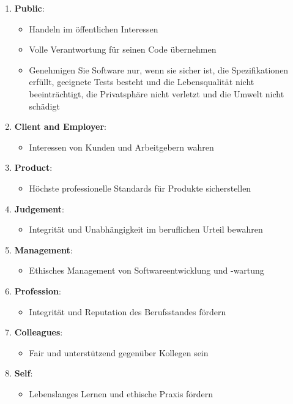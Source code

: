 \documentclass[11pt, a4paper]{article}
\begin{document}
\begin{enumerate}
    \item \textbf{Public}:
    \begin{itemize}
        \item Handeln im öffentlichen Interessen
        \item Volle Verantwortung für seinen Code übernehmen
        \item Genehmigen Sie Software nur, wenn sie sicher ist, die Spezifikationen erfüllt, 
        geeignete Tests besteht und die Lebensqualität nicht beeinträchtigt, 
        die Privatsphäre nicht verletzt und die Umwelt nicht schädigt
    \end{itemize}

    \item \textbf{Client and Employer}:
    \begin{itemize}
        \item Interessen von Kunden und Arbeitgebern wahren
    \end{itemize}

    \item \textbf{Product}:
    \begin{itemize}
        \item Höchste professionelle Standards für Produkte sicherstellen
    \end{itemize}

    \item \textbf{Judgement}:
    \begin{itemize}
        \item Integrität und Unabhängigkeit im beruflichen Urteil bewahren
    \end{itemize}

    \item \textbf{Management}:
    \begin{itemize}
        \item Ethisches Management von Softwareentwicklung und -wartung
    \end{itemize}

    \item \textbf{Profession}:
    \begin{itemize}
        \item Integrität und Reputation des Berufsstandes fördern
    \end{itemize}

    \item \textbf{Colleagues}:
    \begin{itemize}
        \item Fair und unterstützend gegenüber Kollegen sein
    \end{itemize}

    \item \textbf{Self}:
    \begin{itemize}
        \item Lebenslanges Lernen und ethische Praxis fördern
    \end{itemize}
\end{enumerate}
\end{document}
